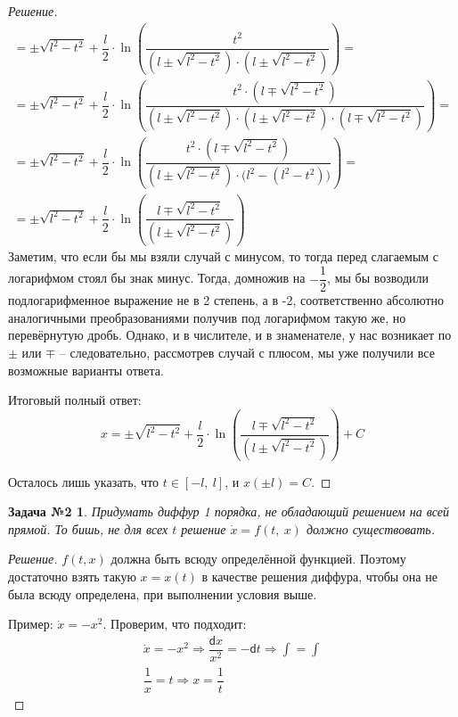 \documentclass[a4paper,12pt]{article}
\newtheorem*{task2}{Задача №2}
\renewcommand{\d}{\mathsf{d}}
\newcommand{\dx}{\dot{x}}
\newcommand{\ds}{\displaystyle}
\begin{document}
\begin{proof}[Решение]
\begin{gather*}
		= \ds\pm \sqrt{l^2 - t^2} + \dfrac{l}{2}\cdot \ln\left(\dfrac{t^2}{(l \pm \sqrt{l^2 - t^2})\cdot(l \pm \sqrt{l^2 - t^2})}\right) = \\
		= \ds\pm \sqrt{l^2 - t^2} + \dfrac{l}{2}\cdot \ln\left(\dfrac{t^2\cdot (l \mp \sqrt{l^2 - t^2})}{(l \pm \sqrt{l^2 - t^2})\cdot(l \pm \sqrt{l^2 - t^2})\cdot (l \mp \sqrt{l^2 - t^2})}\right) = \\
		= \ds\pm \sqrt{l^2 - t^2} + \dfrac{l}{2}\cdot \ln\left(\dfrac{t^2\cdot (l \mp \sqrt{l^2 - t^2})}{(l \pm \sqrt{l^2 - t^2})\cdot\big(l^2 - (l^2 - t^2)\big)}\right) = \\
		= \ds\pm \sqrt{l^2 - t^2} + \dfrac{l}{2}\cdot \ln\left(\dfrac{l \mp \sqrt{l^2 - t^2}}{(l \pm \sqrt{l^2 - t^2})}\right)
	\end{gather*}
	Заметим, что если бы мы взяли случай с минусом, то тогда перед слагаемым с логарифмом стоял бы знак минус. Тогда, домножив на $-\dfrac{1}{2}$, мы бы возводили подлогарифменное выражение не в 2 степень, а в -2, соответственно абсолютно аналогичными преобразованиями получив под логарифмом такую же, но перевёрнутую дробь. Однако, и в числителе, и в знаменателе, у нас возникает по $\pm$ или $\mp$ -- следовательно, рассмотрев случай с плюсом, мы уже получили все возможные варианты ответа.
	
	Итоговый полный ответ:
	\[x = \ds\pm \sqrt{l^2 - t^2} + \dfrac{l}{2}\cdot \ln\left(\dfrac{l \mp \sqrt{l^2 - t^2}}{(l \pm \sqrt{l^2 - t^2})}\right) + C\]
	
	Осталось лишь указать, что $t \in [-l,\ l]$, и $x(\pm l) = C$. 
\end{proof}

\begin{task2}
	Придумать диффур 1 порядка, не обладающий решением на всей прямой. То бишь, не для всех $t$ решение $\dot{x} = f(t,\ x)$ должно существовать. 
\end{task2}
\begin{proof}[Решение]
	$f(t, x)$  должна быть всюду определённой функцией. Поэтому достаточно взять такую $x = x(t)$ в качестве решения диффура, чтобы она не была всюду определена, при выполнении условия выше.
	
	Пример: $\dx = -x^2$. Проверим, что подходит:
	\begin{gather*}
		\dx = -x^2 \Longrightarrow \dfrac{\d x}{x^2} = -\d t \Longrightarrow \ds\int = \int\\
		\dfrac{1}{x} = t \Longrightarrow x = \dfrac{1}{t}
	\end{gather*}
\end{proof}
\end{document}
